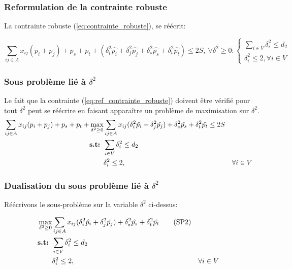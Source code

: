 \documentclass{article}
\begin{document}
\subsubsection{Reformulation de la contrainte robuste}

La contrainte robuste (\ref{eq:contrainte_robuste}), se réécrit:

\begin{equation}
\label{eq:ref_contrainte_robuste}
  \sum_{ij \in A} x_{ij}(p_i + p_j) + p_s + p_t +  (\delta_{i}^{2} \hat{p_i} + \delta_{j}^{2} \hat{p_j} + \delta_{s}^{2} \hat{p_s} + \delta_{t}^{2} \hat{p_t}) \leq 2S,\ \forall \delta^{2} \geq 0: 
\begin{cases}
  \sum_{i \in V} \delta^{2}_{i} \leq d_2 \\
  \delta^{2}_{i} \leq 2, \forall i \in V 
\end{cases} 
\end{equation}


\subsubsection{Sous problème lié à $\delta^{2}$}

Le fait que la contrainte (\ref{eq:ref_contrainte_robuste}) doivent être vérifié pour tout $\delta^{2}$ peut se réécrire en faisant apparaître un problème de maximisation sur $\delta^{2}$.
\begin{align}
  \sum_{ij \in A} x_{ij} (p_i + p_j) + p_s + p_t + 
    \max_{\delta^{2} \geq 0} & \sum_{ij \in A} x_{ij}(\delta^{2}_{i} \hat{p_i} + \delta^{2}_{j} \hat{p_j}) + \delta^{2}_{s} \hat{p_s} + \delta^{2}_{t} \hat{p_t} \leq 2S \\
     \textbf{s.t: } & \sum_{i \in V} \delta^{2}_{i} \leq d_2 \notag \\
     & \delta^{2}_{i} \leq 2, && \forall i \in V \notag
\end{align}


\subsubsection{Dualisation du sous problème lié à $\delta^{2}$}

Réécrivons le sous-problème sur la variable $\delta^{2}$ ci-dessus:

\begin{align}
    \max_{\delta^{2} \geq 0} & \sum_{ij \in A} x_{ij}(\delta^{2}_{i} \hat{p_i} + \delta^{2}_{j} \hat{p_j}) + \delta^{2}_{s} \hat{p_s} + \delta^{2}_{t} \hat{p_t} \tag{SP2} \label{eq:sous-prob-2}\\
     \textbf{s.t: } & \sum_{i \in V} \delta^{2}_{i} \leq d_2 \notag \\
     & \delta^{2}_{i} \leq 2, && \forall i \in V \notag
\end{align}
\end{document}
